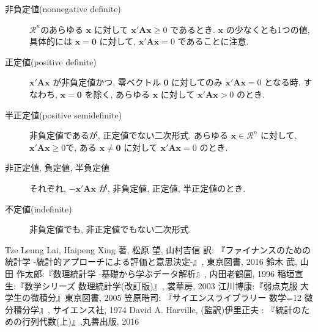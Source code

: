 \documentclass{jsarticle}
\theoremstyle{plain}
\begin{document}
  \begin{description}
    \item[非負定値(nonnegative definite)] $\mathcal{R}^n$\footnotemark のあらゆる $\bm{x}$ に対して $\bm{x}'\bm{A}\bm{x} \geq 0$ であるとき. $\bm{x}$ の少なくとも1つの値, 具体的には $\bm{x} = \bm{0}$ に対して, $\bm{x}'\bm{A}\bm{x} = 0$ であることに注意.
    \item[正定値(positive definite)] $\bm{x}'\bm{A}\bm{x}$ が非負定値かつ, 零ベクトル $\bm{0}$ に対してのみ $\bm{x}'\bm{A}\bm{x} = 0$ となる時. すなわち, $\bm{x} = \bm{0}$ を除く, あらゆる $\bm{x}$ に対して $\bm{x}'\bm{A}\bm{x} > 0$ のとき.
    \item[半正定値(positive semidefinite)] 非負定値であるが, 正定値でない二次形式. あらゆる $\bm{x} \in \mathcal{R}^n$ に対して, $\bm{x}'\bm{A}\bm{x} \geq 0$で, ある $\bm{x} \neq \bm{0}$ に対して $\bm{x}'\bm{A}\bm{x} = 0$ のとき.
    \item[非正定値, 負定値, 半負定値]  それぞれ, $-\bm{x}'\bm{A}\bm{x}$ が, 非負定値, 正定値, 半正定値のとき.
    \item[不定値(indefinite)] 非負定値でも, 非正定値でもない二次形式.
  \end{description}

  \begin{thebibliography}{9}
     Tze Leung Lai, Haipeng Xing 著, 松原 望, 山村吉信 訳: 『ファイナンスのための統計学 -統計的アプローチによる評価と意思決定-』, 東京図書, 2016
     鈴木 武, 山田 作太郎:『数理統計学 -基礎から学ぶデータ解析』, 内田老鶴圃, 1996
     稲垣宣生:『数学シリーズ 数理統計学(改訂版)』, 裳華房, 2003
     江川博康:『弱点克服 大学生の微積分』東京図書, 2005
     笠原晧司: 『サイエンスライブラリー 数学=12 微分積分学』, サイエンス社, 1974
     David A. Harville, (監訳)伊里正夫 : 『統計のための行列代数(上)』,丸善出版, 2016
  \end{thebibliography}
\end{document}
